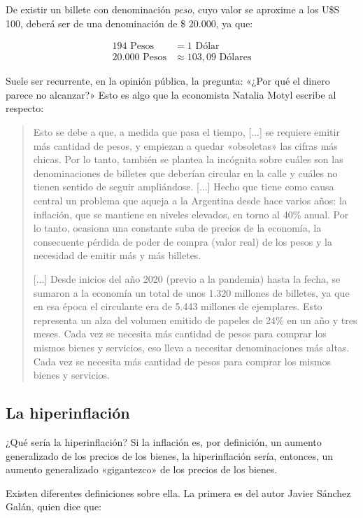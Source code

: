\documentclass[12pt,a4paper,twoside]{book}
\begin{document}
De existir un billete con denominación \textit{peso}, cuyo valor se aproxime a los U\$S 100, deberá ser de una denominación de \$ 20.000, ya que:

\begin{align*}
194 \text{ Pesos} &= 1 \text{ Dólar}  \\
20.000 \text{ Pesos} & \approx 103,09 \text{ Dólares}
\end{align*}

Suele ser recurrente, en la opinión pública, la pregunta: «¿Por qué el dinero parece no alcanzar?» Esto es algo que la economista Natalia Motyl escribe al respecto:

\begin{quotation}
Esto se debe a que, a medida que pasa el tiempo, [...] se requiere emitir más cantidad de pesos, y empiezan a quedar «obsoletas» las cifras más chicas. Por lo tanto, también se plantea la incógnita sobre cuáles son las denominaciones de billetes que deberían circular en la calle y cuáles no tienen sentido de seguir ampliándose. [...] Hecho que tiene como causa central un problema que aqueja a la Argentina desde hace varios años: la inflación, que se mantiene en niveles elevados, en torno al 40\% anual. Por lo tanto, ocasiona una constante suba de precios de la economía, la consecuente pérdida de poder de compra (valor real) de los pesos y la necesidad de emitir más y más billetes.

[...] Desde inicios del año 2020 (previo a la pandemia) hasta la fecha, se sumaron a la economía un total de unos 1.320 millones de billetes, ya que en esa época el circulante era de 5.443 millones de ejemplares. Esto representa un alza del volumen emitido de papeles de 24\% en un año y tres meses. Cada vez se necesita más cantidad de pesos para comprar los mismos bienes y servicios, eso lleva a necesitar denominaciones más altas. Cada vez se necesita más cantidad de pesos para comprar los mismos bienes y servicios. \cite{motyl:pesos}
\end{quotation}

\subsection{La hiperinflación}
¿Qué sería la hiperinflación? Si la inflación es, por definición, un aumento generalizado de los precios de los bienes, la hiperinflación sería, entonces, un aumento generalizado «gigantezco» de los precios de los bienes.

Existen diferentes definiciones sobre ella. La primera es del autor Javier Sánchez Galán, quien dice que:
\end{document}
